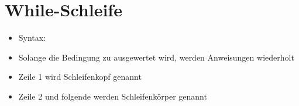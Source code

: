 



\section{While-Schleife}
\subtitle{Kapitel 4: Befehle wiederholen}
\maketitle


\begin{frame}
	\slidehead

	\begin{itemize}
		 \item Syntax:
		 \item Solange die Bedingung zu  ausgewertet wird, werden Anweisungen wiederholt
		 \item Zeile 1 wird Schleifenkopf genannt
		 \item Zeile 2 und folgende werden Schleifenkörper genannt
	\end{itemize}
\end{frame}

